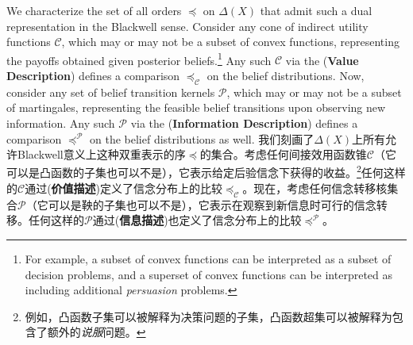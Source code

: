 \documentclass[12pt,letterpaper]{article}
\newenvironment{original}{\color{black}}{}
\newenvironment{translation}{\color{blue}}{}
\theoremstyle{plain}
\theoremstyle{definition}
\theoremstyle{remark}
\newcommand{\Pc}{\mathcal{P}}
\newcommand{\C}{\mathcal{C}}
\theoremstyle{definition}
\begin{document}
\begin{original}
We characterize the set of all orders $\preceq$ on $\Delta(X)$ that admit such a dual representation in the Blackwell sense. Consider any cone of indirect utility functions $\C$, which may or may not be a subset of convex functions, representing the payoffs obtained given posterior beliefs.\footnote{For example, a subset of convex functions can be interpreted as a subset of decision problems, and a superset of convex functions can be interpreted as including additional \textit{persuasion} problems.} Any such $\C$ via the (\textbf{Value Description}) defines a comparison $\preceq_\C$ on the belief distributions. Now, consider any set of belief transition kernels $\mathcal{P}$, which may or may not be a subset of martingales, representing the feasible belief transitions upon observing new information. Any such $\Pc$ via the (\textbf{Information Description}) defines a comparison $\preceq^{\Pc}$ on the belief distributions as well.
\end{original}
\begin{translation}
我们刻画了$\Delta(X)$上所有允许Blackwell意义上这种双重表示的序$\preceq$的集合。考虑任何间接效用函数锥$\C$（它可以是凸函数的子集也可以不是），它表示给定后验信念下获得的收益。\footnote{例如，凸函数子集可以被解释为决策问题的子集，凸函数超集可以被解释为包含了额外的\textit{说服}问题。}任何这样的$\C$通过(\textbf{价值描述})定义了信念分布上的比较$\preceq_\C$。现在，考虑任何信念转移核集合$\mathcal{P}$（它可以是鞅的子集也可以不是），它表示在观察到新信息时可行的信念转移。任何这样的$\Pc$通过(\textbf{信息描述})也定义了信念分布上的比较$\preceq^{\Pc}$。
\end{translation}
\end{document}
